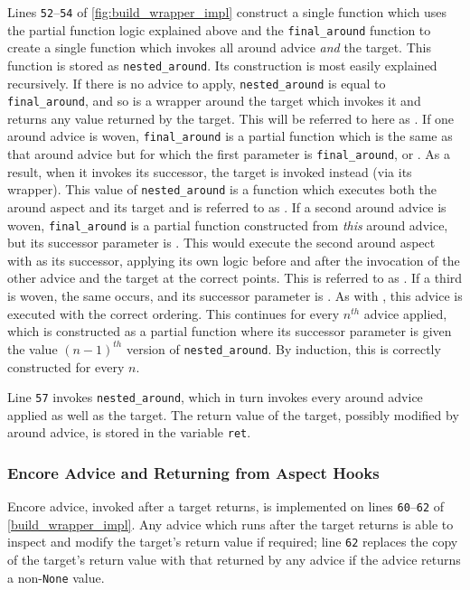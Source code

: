 Lines \texttt{52}--\texttt{54} of \cref{fig:build_wrapper_impl} construct a single function which uses the
partial function logic explained above and the \lstinline{final_around} function
to create a single function which invokes all around advice \emph{and} the
target. This function is stored as \lstinline{nested_around}. Its construction
is most easily explained recursively. If there is no advice to apply,
\lstinline{nested_around} is equal to \lstinline{final_around}, and so is a
wrapper around the target which invokes it and returns any value returned by the
target. This will be referred to here as . If one around advice is
woven, \lstinline{final_around} is a partial function which is the same as that
around advice but for which the first parameter is \lstinline{final_around}, or
. As a result, when it invokes its successor, the target is invoked
instead (via its wrapper). This value of \lstinline{nested_around} is a function
which executes both the around aspect and its target and is referred to as
. If a second around advice is woven, \lstinline{final_around} is a
partial function constructed from \emph{this} around advice, but its successor
parameter is . This would execute the second around aspect with
 as its successor, applying its own logic before and after the
invocation of the other advice and the target at the correct points. This is
referred to as . If a third is woven, the same occurs, and its
successor parameter is . As with , this advice is executed
with the correct ordering. This continues for every $n^{th}$ advice
applied, which is constructed as a partial function where its successor
parameter is given the value $(n-1)^{th}$ version of
\lstinline{nested_around}. By induction, this is correctly constructed for every $n$.

Line \texttt{57} invokes \lstinline{nested_around}, which in turn invokes every
around advice applied as well as the target. The return value of the target,
possibly modified by around advice, is stored in the variable \lstinline{ret}.


\subsubsection{Encore Advice and Returning from Aspect Hooks}

Encore advice, invoked after a target returns, is implemented on lines
\texttt{60}--\texttt{62} of \cref{build_wrapper_impl}. Any advice
which runs after the target returns is able to inspect and modify the target's
return value if required; line \texttt{62} replaces the copy of the target's
return value with that returned by any advice if the advice returns a
non-\lstinline{None} value.

